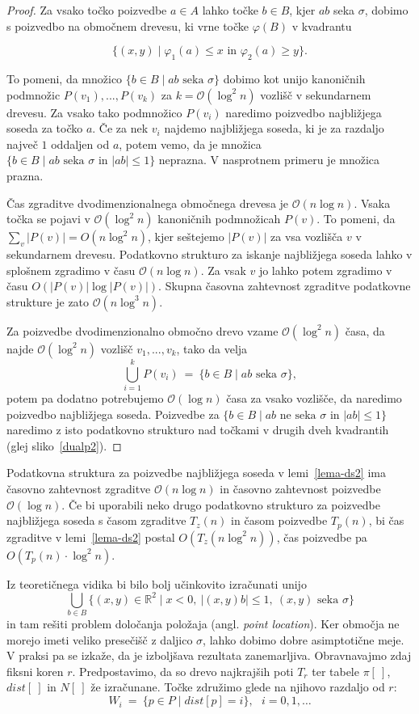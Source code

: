 \documentclass[a4paper, 12pt]{book}
\newcommand{\RR}{\ensuremath{\mathbb R}}  %
\newcommand{\OO}{\ensuremath{\mathcal{O}}} %
\def\dist{\mathit{dist}}
\begin{document}
\begin{proof}
Za vsako točko poizvedbe $a \in A$ lahko točke $b \in B$, kjer $ab$ seka $\sigma$, dobimo s poizvedbo na območnem drevesu, ki vrne točke $\varphi(B)$ v kvadrantu

\[
		\{(x,y)\mid  \varphi_1(a) \leq x \text{ in } \varphi_2(a) \geq y\}.
	\]

To pomeni, da množico $\{ b\in B \mid \text{$ab$ seka $\sigma$}\}$ dobimo kot unijo kanoničnih podmnožic $P(v_1),...,P(v_k)$ za $k = \OO(\log^2n)$ vozlišč v sekundarnem drevesu. Za vsako tako podmnožico $P(v_i)$ naredimo poizvedbo najbližjega soseda za točko $a$. Če za nek $v_i$ najdemo najbližjega soseda, ki je za razdaljo največ $1$ oddaljen od $a$, potem vemo, da je množica $\{ b\in B \mid \text{$ab$ seka $\sigma$ in $|ab|\le 1$}\}$ neprazna. V nasprotnem primeru je množica prazna.

Čas zgraditve dvodimenzionalnega območnega drevesa je $\OO(n\log n)$. Vsaka točka se pojavi v $\OO(\log^2n)$ kanoničnih podmnožicah $P(v)$. To pomeni, da $\sum_v |P(v)| = O( n\log^2 n)$, kjer seštejemo $|P(v)|$ za vsa vozlišča $v$ v sekundarnem drevesu. Podatkovno strukturo za iskanje najbližjega soseda lahko v splošnem zgradimo v času $\OO(n\log n)$. Za vsak $v$ jo lahko potem zgradimo v času $O(|P(v)| \log |P(v)|)$. Skupna časovna zahtevnost zgraditve podatkovne strukture je zato $\OO(n\log^3n)$.

Za poizvedbe dvodimenzionalno območno drevo vzame $\OO(\log^2n)$ časa, da  najde $\OO(\log^2n)$ vozlišč $v_1,...,v_k$, tako da velja
\[
		\bigcup_{i=1}^k P(v_i) ~=~ \{ b\in B \mid \text{$ab$ seka $\sigma$}\},
\]
potem pa dodatno potrebujemo $\OO(\log n)$ časa za vsako vozlišče, da naredimo poizvedbo najbližjega soseda. Poizvedbe za $\{ b\in B \mid \text{$ab$ ne seka $\sigma$ in $|ab|\le 1$}\}$ naredimo z isto podatkovno strukturo nad točkami v drugih dveh kvadrantih (glej sliko~\ref{dualp2}).
\end{proof}

Podatkovna struktura za poizvedbe najbližjega soseda v lemi~\ref{lema-ds2} ima časovno zahtevnost zgraditve $\OO(n\log n)$ in časovno zahtevnost poizvedbe $\OO(\log n)$. Če bi uporabili neko drugo podatkovno strukturo za poizvedbe najbližjega soseda s časom zgraditve $T_z(n)$ in časom poizvedbe $T_p(n)$, bi čas zgraditve v lemi~\ref{lema-ds2} postal $O(T_z(n\log^2 n))$, čas poizvedbe pa $O(T_p(n)\cdot \log^2 n)$.

Iz teoretičnega vidika bi bilo bolj učinkovito izračunati unijo
\[
	\bigcup_{b\in B} \{ (x,y)\in \RR^2\mid x<0,~ |(x,y)b|\le 1,~ (x,y) 
			\text{ seka } \sigma \}
\]
in tam rešiti problem določanja položaja (angl. \textit{point location}). Ker območja ne morejo imeti veliko presečišč z daljico $\sigma$, lahko dobimo dobre asimptotične meje. V praksi pa se izkaže, da je izboljšava rezultata zanemarljiva.
\bigbreak
Obravnavajmo zdaj fiksni koren $r$. Predpostavimo, da so drevo najkrajših poti $T_r$ ter tabele $\pi[~]$, $\dist[~]$ in $N[~]$ že izračunane. Točke združimo glede na njihovo razdaljo od $r$:
\[
	W_i ~=~ \{ p\in P \mid \dist[p]=i \},~~~ i=0,1,\dots
\]
\end{document}
